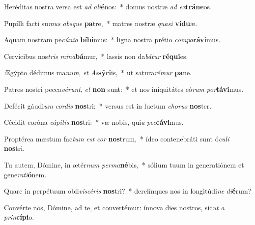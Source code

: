 \item Heréditas nostra versa est \textit{ad} \textit{a}\textit{li}\textbf{é}nos:~* domus nostræ \textit{ad} \textit{ex}\textbf{trá}\textbf{ne}os.
\item Pupílli facti su\textit{mus} \textit{abs}\textit{que} \textbf{pa}tre,~* matres nostræ \textit{qua}\textit{si} \textbf{ví}\textbf{du}æ.
\item Aquam nostram pe\textit{cú}\textit{ni}\textit{a} \textbf{bí}\textbf{bi}mus:~* ligna nostra prétio \textit{com}\textit{pa}\textbf{rá}\textbf{vi}mus.
\item Cervícibus nos\textit{tris} \textit{mi}\textit{na}\textbf{bá}mur,~* lassis non da\textit{bá}\textit{tur} \textbf{ré}\textbf{qui}es.
\item Ægýpto dédimus ma\textit{num}, \textit{et} \textit{As}\textbf{sý}\textbf{ri}is,~* ut satura\textit{ré}\textit{mur} \textbf{pa}ne.
\item Patres nostri pecca\textit{vé}\textit{runt}, \textit{et} \textbf{non} sunt:~* et nos iniquitátes eó\textit{rum} \textit{por}\textbf{tá}\textbf{vi}mus.
\item Defécit gáudi\textit{um} \textit{cor}\textit{dis} \textbf{nos}tri:~* versus est in luctum \textit{cho}\textit{rus} \textbf{nos}ter.
\item Cécidit coróna \textit{cá}\textit{pi}\textit{tis} \textbf{nos}tri:~* væ nobis, qui\textit{a} \textit{pec}\textbf{cá}\textbf{vi}mus.
\item Proptérea mæstum fac\textit{tum} \textit{est} \textit{cor} \textbf{nos}trum,~* ídeo contenebráti sunt ó\textit{cu}\textit{li} \textbf{nos}tri.
\item Tu autem, Dómine, in ætér\textit{num} \textit{per}\textit{ma}\textbf{né}bis,~* sólium tuum in generatiónem et gene\textit{ra}\textit{ti}\textbf{ó}nem.
\item Quare in perpétuum obli\textit{vi}\textit{scé}\textit{ris} \textbf{nos}tri?~* derelínques nos in longitúdi\textit{ne} \textit{di}\textbf{é}rum?
\item Convérte nos, Dómine, ad te, et convertémur: ínnova dies nostros, sic\textit{ut} \textit{a} \textit{prin}\textbf{cí}\textbf{pi}o.

